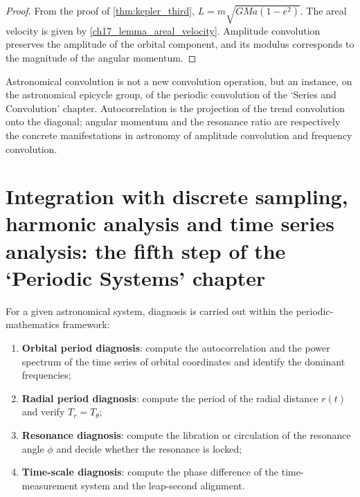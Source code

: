 \begin{proof}
From the proof of \cref{thm:kepler_third}, \(L=m\sqrt{GMa(1-e^2)}\). The areal velocity is given by \cref{ch17_lemma_areal_velocity}. Amplitude convolution preserves the amplitude of the orbital component, and its modulus corresponds to the magnitude of the angular momentum.
\end{proof}

\begin{remark}\label{rem:astro_convolution_relation}
Astronomical convolution is not a new convolution operation, but an instance, on the astronomical epicycle group, of the periodic convolution of the `Series and Convolution' chapter. Autocorrelation is the projection of the trend convolution onto the diagonal; angular momentum and the resonance ratio are respectively the concrete manifestations in astronomy of amplitude convolution and frequency convolution.
\end{remark}

\section{Integration with discrete sampling, harmonic analysis and time series analysis: the fifth step of the `Periodic Systems' chapter}
\label{sec:astro_integration}

\begin{definition}\label{def:astro_periodic_diagnosis}
For a given astronomical system, diagnosis is carried out within the periodic-mathematics framework:
\begin{enumerate}[label=(\roman*)]
    \item \textbf{Orbital period diagnosis}: compute the autocorrelation and the power spectrum of the time series of orbital coordinates and identify the dominant frequencies;
    \item \textbf{Radial period diagnosis}: compute the period of the radial distance \(r(t)\) and verify \(T_r=T_\theta\);
    \item \textbf{Resonance diagnosis}: compute the libration or circulation of the resonance angle \(\phi\) and decide whether the resonance is locked;
    \item \textbf{Time-scale diagnosis}: compute the phase difference of the time-measurement system and the leap-second alignment.
\end{enumerate}
\end{definition}

